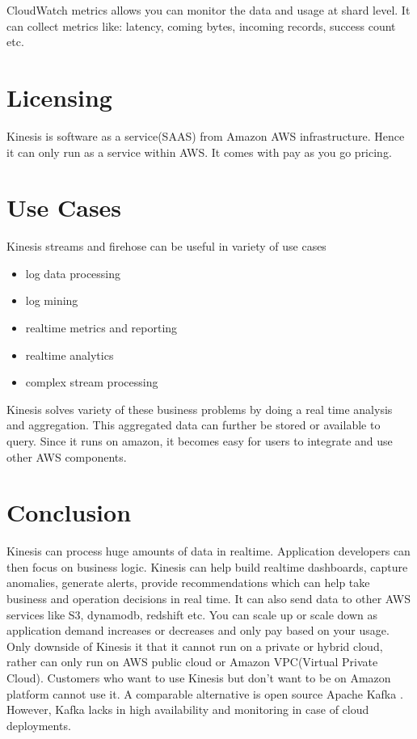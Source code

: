 \documentclass[9pt,twocolumn,twoside]{../../styles/osajnl}
\begin{document}
CloudWatch metrics allows you can monitor the data and usage at shard level.  It
can collect metrics like: latency, coming bytes, incoming records, success count
etc.

\section{Licensing}
Kinesis is software as a service(SAAS) from Amazon AWS infrastructure. Hence it
can only run as a service within AWS. It comes with pay as you go pricing.

\section{Use Cases}
Kinesis streams \cite{www-kinesis} and firehose can be useful in variety of use
cases
\begin{itemize}
	\item log data processing
	\item log mining
	\item realtime metrics and reporting
	\item realtime analytics
	\item complex stream processing
\end{itemize}

Kinesis solves variety of these business problems by doing a real time analysis
and aggregation. This aggregated data can further be stored or available to
query. Since it runs on amazon, it becomes easy for users to integrate and use
other AWS components.

\section{Conclusion}
Kinesis can process huge amounts of data in realtime. Application developers can
then focus on business logic. Kinesis \cite{varia2014overview} can help build
realtime dashboards, capture anomalies, generate alerts, provide recommendations
which can help take business and operation decisions in real time. It can also
send data to other AWS services like S3, dynamodb, redshift etc. You can scale
up or scale down as application demand increases or decreases and only pay based
on your usage. Only downside of Kinesis it that it cannot run on a private or
hybrid cloud, rather can only run on AWS public cloud or Amazon VPC(Virtual
Private Cloud).  Customers who want to use Kinesis but don't want to be on
Amazon platform cannot use it. A comparable alternative is open source Apache
Kafka \cite{deyhim2016kafka} .  However, Kafka lacks in high availability and
monitoring in case of cloud deployments. 
\end{document}
